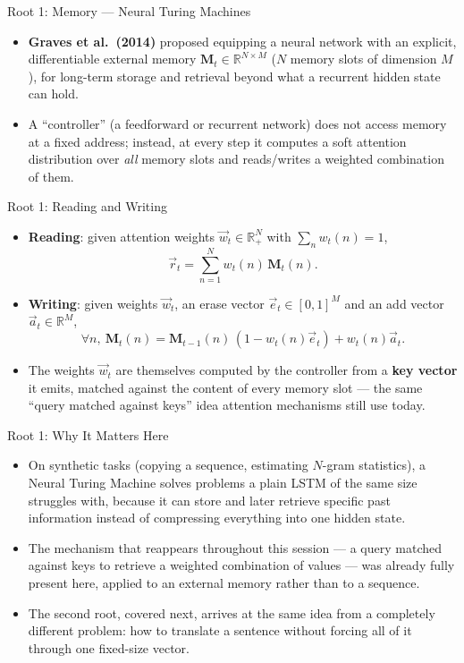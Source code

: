 \begin{vbframe}{Root 1: Memory --- Neural Turing Machines}
\begin{itemize}
  \item \textbf{Graves et al.\ (2014)} proposed equipping a neural network with an explicit, differentiable external memory $\mathbf{M}_t \in \mathbb{R}^{N \times M}$ ($N$ memory slots of dimension $M$), for long-term storage and retrieval beyond what a recurrent hidden state can hold.
  \item A ``controller'' (a feedforward or recurrent network) does not access memory at a fixed address; instead, at every step it computes a soft attention distribution over \emph{all} memory slots and reads/writes a weighted combination of them.
\end{itemize}
\end{vbframe}

\begin{vbframe}{Root 1: Reading and Writing}
\begin{itemize}
  \item \textbf{Reading}: given attention weights $\vec w_t \in \mathbb{R}_+^N$ with $\sum_n w_t(n) = 1$,
  $$ \vec r_t = \sum_{n=1}^N w_t(n) \, \mathbf{M}_t(n). $$
  \item \textbf{Writing}: given weights $\vec w_t$, an erase vector $\vec e_t \in [0,1]^M$ and an add vector $\vec a_t \in \mathbb{R}^M$,
  $$ \forall n,\ \mathbf{M}_t(n) = \mathbf{M}_{t-1}(n)\,(1 - w_t(n)\vec e_t) + w_t(n)\vec a_t. $$
  \item The weights $\vec w_t$ are themselves computed by the controller from a \textbf{key vector} it emits, matched against the content of every memory slot --- the same ``query matched against keys'' idea attention mechanisms still use today.
\end{itemize}
\end{vbframe}

\begin{vbframe}{Root 1: Why It Matters Here}
\begin{itemize}
  \item On synthetic tasks (copying a sequence, estimating $N$-gram statistics), a Neural Turing Machine solves problems a plain LSTM of the same size struggles with, because it can store and later retrieve specific past information instead of compressing everything into one hidden state.
  \item The mechanism that reappears throughout this session --- a query matched against keys to retrieve a weighted combination of values --- was already fully present here, applied to an external memory rather than to a sequence.
  \item The second root, covered next, arrives at the same idea from a completely different problem: how to translate a sentence without forcing all of it through one fixed-size vector.
\end{itemize}
\end{vbframe}

